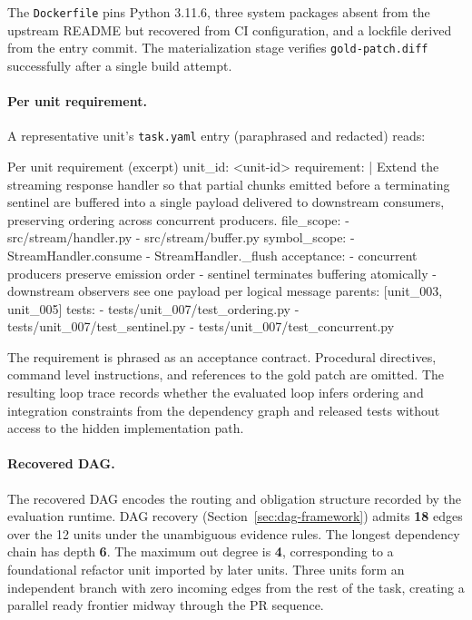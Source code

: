 The \texttt{Dockerfile} pins Python 3.11.6, three system packages absent from the upstream README but recovered from CI configuration, and a lockfile derived from the entry commit. The materialization stage verifies \texttt{gold-patch.diff} successfully after a single build attempt.

\paragraph{Per unit requirement.}
A representative unit's \texttt{task.yaml} entry (paraphrased and redacted) reads:
\begin{promptbox}{Per unit requirement (excerpt)}
unit_id: <unit-id>
requirement: |
  Extend the streaming response handler so that
  partial chunks emitted before a terminating
  sentinel are buffered into a single payload
  delivered to downstream consumers, preserving
  ordering across concurrent producers.
file_scope:
  - src/stream/handler.py
  - src/stream/buffer.py
symbol_scope:
  - StreamHandler.consume
  - StreamHandler._flush
acceptance:
  - concurrent producers preserve emission order
  - sentinel terminates buffering atomically
  - downstream observers see one payload per
    logical message
parents: [unit_003, unit_005]
tests:
  - tests/unit_007/test_ordering.py
  - tests/unit_007/test_sentinel.py
  - tests/unit_007/test_concurrent.py
\end{promptbox}

The requirement is phrased as an acceptance contract. Procedural directives, command level instructions, and references to the gold patch are omitted. The resulting loop trace records whether the evaluated loop infers ordering and integration constraints from the dependency graph and released tests without access to the hidden implementation path.

\paragraph{Recovered DAG.}

The recovered DAG encodes the routing and obligation structure recorded by the evaluation runtime. DAG recovery (Section~\ref{sec:dag-framework}) admits \textbf{18} edges over the 12 units under the unambiguous evidence rules. The longest dependency chain has depth \textbf{6}. The maximum out degree is \textbf{4}, corresponding to a foundational refactor unit imported by later units. Three units form an independent branch with zero incoming edges from the rest of the task, creating a parallel ready frontier midway through the PR sequence.

